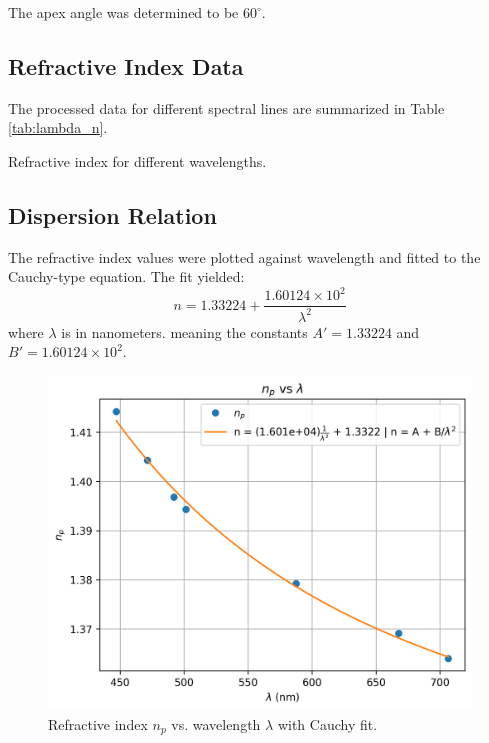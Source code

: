 \documentclass[journal]{IEEEtran}
\begin{document}
The apex angle was determined to be $60^\circ$.

\subsection{Refractive Index Data}
The processed data for different spectral lines are summarized in Table \ref{tab:lambda_n}.

\begin{table}[H]
    \centering
    \caption{Refractive index for different wavelengths.}
    \label{tab:lambda_n}
\end{table}

\subsection{Dispersion Relation}
The refractive index values were plotted against wavelength and fitted to the Cauchy-type equation. The fit yielded:
\begin{equation}
n = 1.33224 + \frac{1.60124 \times 10^2}{\lambda^2}
\end{equation}
where \( \lambda \) is in nanometers.
meaning the constants \( A' = 1.33224 \) and \( B' = 1.60124 \times 10^2 \).
\begin{figure}[H]
    \centering
    \includegraphics[width=0.8\linewidth]{../plots/npVSlambda.png}
    \caption{Refractive index $n_p$ vs. wavelength $\lambda$ with Cauchy fit.}
    \label{fig:np_vs_lambda}
\end{figure}
\end{document}
